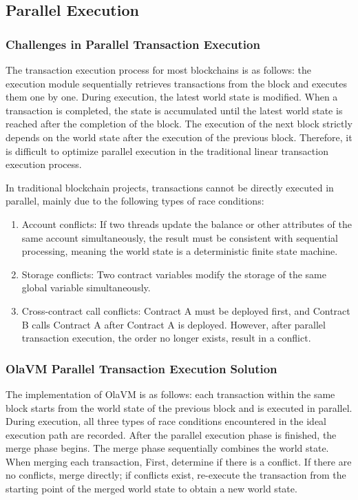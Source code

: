 \subsection{Parallel Execution}\label{section: parallel-execution}

\subsubsection{Challenges in Parallel Transaction Execution}

The transaction execution process for most blockchains is as follows: the execution module sequentially retrieves transactions from the block and executes them one by one. During execution, the latest world state is modified. When a transaction is completed, the state is accumulated until the latest world state is reached after the completion of the block. The execution of the next block strictly depends on the world state after the execution of the previous block. Therefore, it is difficult to optimize parallel execution in the traditional linear transaction execution process.

In traditional blockchain projects, transactions cannot be directly executed in parallel, mainly due to the following types of race conditions:

\begin{enumerate}
    \item Account conflicts: If two threads update the balance or other attributes of the same account simultaneously, the result must be consistent with sequential processing, meaning the world state is a deterministic finite state machine.
    \item Storage conflicts: Two contract variables modify the storage of the same global variable simultaneously.
    \item Cross-contract call conflicts: Contract A must be deployed first, and Contract B calls Contract A after Contract A is deployed. However, after parallel transaction execution, the order no longer exists, result in a conflict.
\end{enumerate}

\subsubsection{OlaVM Parallel Transaction Execution Solution}

The implementation of OlaVM is as follows: each transaction within the same block starts from the world state of the previous block and is executed in parallel. During execution, all three types of race conditions encountered in the ideal execution path are recorded. After the parallel execution phase is finished, the merge phase begins. The merge phase sequentially combines the world state. When merging each transaction, First, determine if there is a conflict.  If there are no conflicts, merge directly; if conflicts exist, re-execute the transaction from the starting point of the merged world state to obtain a new world state.

